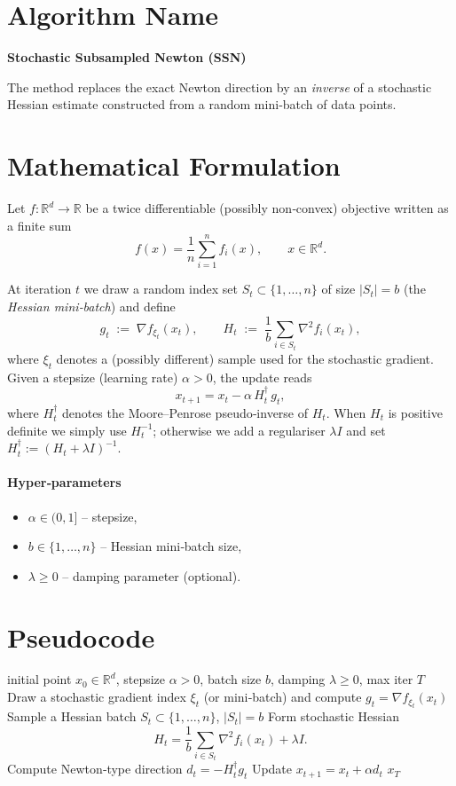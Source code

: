 \documentclass{article}
\newcommand{\R}{\mathbb{R}}
\begin{document}
\section*{Algorithm Name}
\textbf{Stochastic Subsampled Newton (SSN)}  

The method replaces the exact Newton direction by an \emph{inverse} of a stochastic Hessian
estimate constructed from a random mini‑batch of data points.

\section*{Mathematical Formulation}
Let $f:\R^{d}\!\to\!\R$ be a twice differentiable (possibly non‑convex) objective written as a finite sum
\[
f(x)=\frac{1}{n}\sum_{i=1}^{n} f_i(x),\qquad x\in\R^{d}.
\]

At iteration $t$ we draw a random index set $S_t\subset\{1,\dots,n\}$ of size $|S_t|=b$ (the \emph{Hessian mini‑batch}) and define
\[
g_t \;:=\; \nabla f_{ \xi_t }(x_t),\qquad 
H_t \;:=\; \frac{1}{b}\sum_{i\in S_t}\nabla^{2} f_i(x_t),
\]
where $\xi_t$ denotes a (possibly different) sample used for the stochastic gradient.
Given a stepsize (learning rate) $\alpha>0$, the update reads
\begin{equation}\label{eq:update}
x_{t+1}=x_t-\alpha\, H_t^{\dagger}\, g_t,
\end{equation}
where $H_t^{\dagger}$ denotes the Moore–Penrose pseudo‑inverse of $H_t$.  
When $H_t$ is positive definite we simply use $H_t^{-1}$; otherwise we add a regulariser
$\lambda I$ and set $H_t^{\dagger}:=(H_t+\lambda I)^{-1}$.

\paragraph{Hyper‑parameters}
\begin{itemize}[leftmargin=*]
  \item $\alpha\in(0,1]$ – stepsize,
  \item $b\in\{1,\dots,n\}$ – Hessian mini‑batch size,
  \item $\lambda\ge 0$ – damping parameter (optional).
\end{itemize}

\section*{Pseudocode}
\begin{algorithm}[H]
\caption{Stochastic Subsampled Newton (SSN)}
\begin{algorithmic}[1]
\REQUIRE initial point $x_0\in\R^{d}$, stepsize $\alpha>0$, batch size $b$, damping $\lambda\ge0$, max iter $T$
    \STATE Draw a stochastic gradient index $\xi_t$ (or mini‑batch) and compute $g_t=\nabla f_{\xi_t}(x_t)$
    \STATE Sample a Hessian batch $S_t\subset\{1,\dots,n\}$, $|S_t|=b$
    \STATE Form stochastic Hessian 
    \[
    H_t=\frac{1}{b}\sum_{i\in S_t}\nabla^{2}f_i(x_t)+\lambda I .
    \]
    \STATE Compute Newton‑type direction $d_t= - H_t^{\dagger} g_t$
    \STATE Update $x_{t+1}=x_t+\alpha d_t$
\ENDFOR
\RETURN $x_T$
\end{algorithmic}
\end{algorithm}
\end{document}
